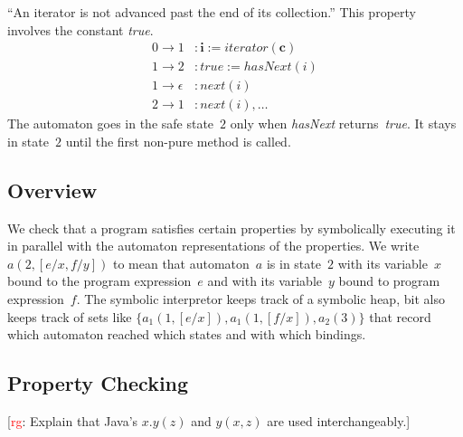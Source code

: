 \documentclass[a4paper]{article}
\newcommand{\todo}[2]{{\small [\textcolor{red}{#1}: #2]}}
\newcommand{\rg}[1]{\todo{rg}{#1}}
\theoremstyle{remark}
\begin{document}
``An iterator is not advanced past the end of its collection.''
This property involves the constant \textit{true}.
\begin{equation}\label{eq:iter3}
\begin{aligned}
0\to1&: \mathbf{i} := \mathit{iterator}(\mathbf{c}) \\
1\to2&: \mathit{true} := \mathit{hasNext}(i) \\
1\to\epsilon&: \mathit{next}(i) \\
2\to1&: \mathit{next}(i), \ldots
\end{aligned}
\end{equation}
The automaton goes in the safe state~$2$ only when \textit{hasNext} returns~\textit{true}.
It stays in state~$2$ until the first non-pure method is called.

\subsection{Overview}\label{sec:overview} %

We check that a program satisfies certain properties by symbolically executing it in parallel with the automaton representations of the properties.
We write $a(2,[e/x,f/y])$ to mean that automaton~$a$ is in state~$2$ with its variable~$x$ bound to the program expression~$e$ and with its variable~$y$ bound to program expression~$f$.
The symbolic interpretor keeps track of a symbolic heap, bit also keeps track of sets like $\{a_1(1,[e/x]), a_1(1,[f/x]), a_2(3)\}$ that record which automaton reached which states and with which bindings.

\subsection{Property Checking}\label{sec:property_checking} %

\rg{Explain that Java's $x.y(z)$ and $y(x, z)$ are used interchangeably.}
\end{document}
